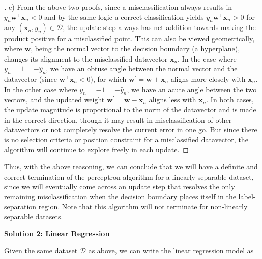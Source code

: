 \documentclass{article}
\renewcommand{\vec}[1]{\mathbf{#1}}
\begin{document}
    \begin{proof}[\unskip\nopunct]
        c) From the above two proofs, since a misclassification always 
        results in $y_n\vec{w}^\intercal \vec{x}_n < 0$ and by the same 
        logic a correct classification yields $y_n\vec{w}^\intercal \vec{x}_n
        > 0$ for any $(\vec{x}_n, y_n) \in \mathcal{D}$, the update step 
        always has net addition towards making the product positive for a 
        misclassified point. This can also be viewed geometrically, where
        $\vec{w}$, being the normal vector to the decision boundary (a 
        hyperplane), changes its alignment to the misclassified datavector 
        $\vec{x}_n$. In the case where $y_n = 1 = -\hat{y}_n$, we have an 
        obtuse angle between the normal vector and the datavector (since $\vec
        {w}^\intercal \vec{x}_n < 0$), for which $\vec{w} ^{\prime} = \vec{w}+
        \vec{x}_n$ aligns more closely with $\vec{x}_n$. In the other case 
        where $y_n = -1 = -\hat{y}_n$, we have an acute angle between the two
        vectors, and the updated weight $\vec{w}^{\prime} =
        \vec{w} - \vec{x}_n$ aligns less with $\vec{x}_n$. In both cases, the
        update magnitude is proportional to the norm of the datavector and 
        is made in the correct direction, though it may result in
        misclassification of other datavectors or not completely 
        resolve the current error in one go. But since there is no selection
        criteria or position constraint for a misclassified datavector, the
        algorithm will continue to explore freely in each update.
    \end{proof}

    Thus, with the above reasoning, we can conclude that we will have a
    definite and correct termination of the perceptron algorithm for a 
    linearly separable dataset, since we will eventually come across an
    update step that resolves the only remaining misclassification when the
    decision boundary places itself in the label-separation region. Note that
    this algorithm will not terminate for non-linearly separable datasets.
    
    \vspace{0.5cm}

    \textbf{Solution 2: Linear Regression}

    Given the same dataset $\mathcal{D}$ as above, we can write the linear 
    regression model as
\end{document}
